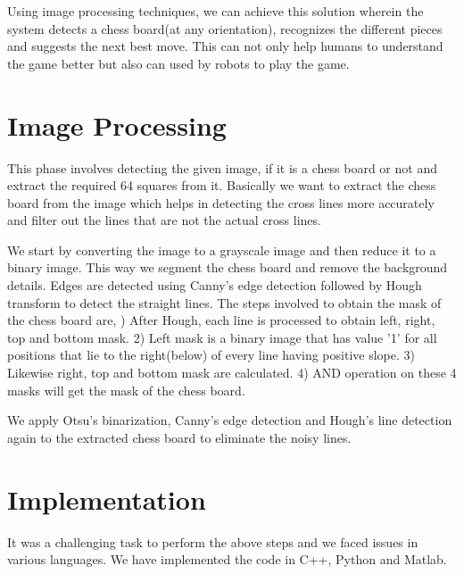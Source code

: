 \documentclass[conference]{IEEEtran}
\begin{document}
Using image processing techniques, we can achieve this solution wherein the system detects a chess board(at any orientation), recognizes the different pieces and suggests the next best move. This can not only help humans to understand the game better but also can used by robots to play the game. 




\section{Image Processing}
This phase involves detecting the given image, if it is a chess board or not and extract the required 64 squares from it. Basically we want to extract the chess board from the image which helps in detecting the cross lines more accurately and filter out the lines that are not the actual cross lines.

We start by converting the image to a grayscale image and then reduce it to a binary image. This way we segment the chess board and remove the background details. Edges are detected using Canny's edge detection followed by Hough transform to detect the straight lines. The steps involved to obtain the mask of the chess board are, ) After Hough, each line is processed to obtain left, right, top and bottom mask.
2) Left mask is a binary image that has value '1' for all positions that lie to the right(below) of every line having positive slope.
3) Likewise right, top and bottom mask are calculated.
4) AND operation on these 4 masks will get the mask of the chess board.

We apply Otsu's binarization, Canny's edge detection and Hough's line detection again to the extracted chess board to eliminate the noisy lines.

\section{Implementation}
It was a challenging task to perform the above steps and we faced issues in various languages. 
We have implemented the code in C++, Python and Matlab. 
\end{document}
